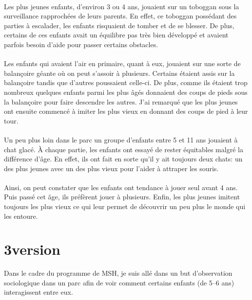 \paragraph{} Les plus jeunes enfants, d'environ 3 ou 4 ans, jouaient sur un
toboggan sous la surveillance rapprochées de leurs parents. En effet, ce
toboggan possédant des parties à escalader, les enfants risquaient de tomber et
de se blesser. De plus, certains de ces enfants avait un équilibre pas très
bien développé et avaient parfois besoin d'aide pour passer certains obstacles.

\paragraph{} Les enfants qui avaient l'air en primaire, quant à eux, jouaient
sur une sorte de balançoire géante où on peut s'assoir à plusieurs. Certains
étaient assis sur la balançoire tandis que d'autres poussaient celle-ci. De
plus, comme ils étaient trop nombreux quelques enfants parmi les plus âgés
donnaient des coups de pieds sous la balançoire pour faire descendre les
autres. J'ai remarqué que les plus jeunes ont ensuite commencé à imiter les
plus vieux en donnant des coups de pied à leur tour.

\paragraph{} Un peu plus loin dans le parc un groupe d'enfants entre 5 et 11
ans jouaient à chat glacé. À chaque partie, les enfants ont essayé de rester
équitables malgré la différence d'âge. En effet, ils ont fait en sorte qu'il y
ait toujours deux chats: un des plus jeunes avec un des plus vieux pour l'aider
à attraper les souris.

\paragraph{} Ainsi, on peut constater que les enfants ont tendance à jouer seul
avant 4 ans. Puis passé cet âge, ils préfèrent jouer à plusieurs. Enfin, les
plus jeunes imitent toujours les plus vieux ce qui leur permet de découvrir un
peu plus le monde qui les entoure.

\section{3\ieme version}

\paragraph{} Dans le cadre du programme de MSH, je suis allé dans un but
d'observation sociologique dans un parc afin de voir comment certains enfants
(de 5--6 ans) interagissent entre eux.

